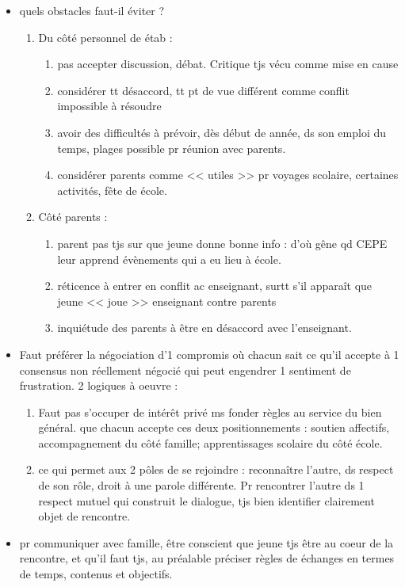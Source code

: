 \documentclass[12pt]{article}
\begin{document}
\begin{itemize}
\item quels obstacles faut-il éviter ?
\begin{enumerate}
\item Du côté personnel de étab : 
\begin{enumerate}
\item pas accepter discussion, débat. Critique tjs vécu comme mise en cause \\
\item considérer tt désaccord, tt pt de vue différent comme conflit impossible à résoudre \\
\item avoir des difficultés à prévoir, dès début de année, ds son emploi du temps, plages possible pr réunion avec parents.\\
\item considérer parents comme << utiles >> pr voyages scolaire, certaines activités, fête de école.
\end{enumerate}

\item Côté parents : 
\begin{enumerate}
\item parent pas tjs sur que jeune donne bonne info : d'où gêne qd CEPE leur apprend évènements qui a eu lieu à école.\\
\item réticence à entrer en conflit ac enseignant, surtt s'il apparaît que jeune << joue >> enseignant contre parents \\
\item inquiétude des parents à être en désaccord avec l'enseignant.\\
\end{enumerate}
\end{enumerate}

\item Faut préférer la négociation d'1 compromis où chacun sait ce qu'il accepte à 1 consensus non réellement négocié qui peut engendrer 1 sentiment de frustration. 2 logiques à oeuvre : 
\begin{enumerate}
\item Faut pas s'occuper de intérêt privé ms fonder règles au service du bien général. que chacun accepte ces deux positionnements : soutien affectifs, accompagnement du côté famille; apprentissages scolaire du côté école.\\
\item ce qui permet aux 2 pôles de se rejoindre : reconnaître l'autre, ds respect de son rôle, droit à une parole différente. Pr rencontrer l'autre ds  1 respect mutuel qui construit le dialogue, tjs bien identifier clairement objet de rencontre. \\
\end{enumerate}

\item pr communiquer avec famille, être conscient que jeune tjs être au coeur de la rencontre, et qu'il faut tjs, au préalable préciser règles de échanges en termes de temps, contenus et objectifs.
















\end{itemize}
\end{document}
